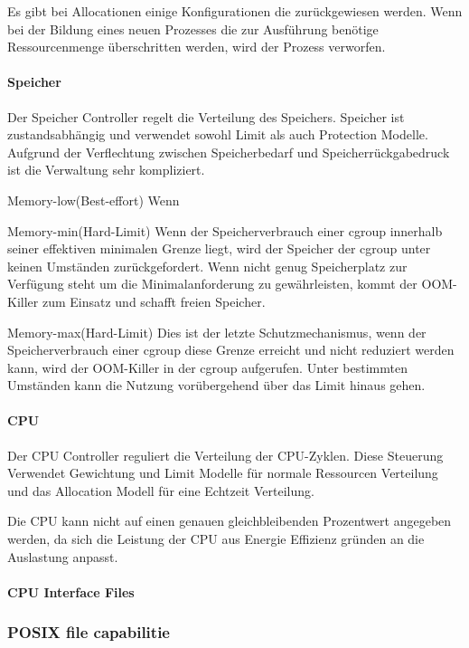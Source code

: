 \documentclass[12pt,a4paper,bibliography=totocnumbered,listof=totocnumbered]{scrartcl}
\begin{document}
Es gibt bei Allocationen einige Konfigurationen die zurückgewiesen werden. Wenn bei der Bildung eines neuen Prozesses die zur Ausführung benötige Ressourcenmenge überschritten werden, wird der Prozess verworfen.

\paragraph{Speicher}
Der Speicher Controller regelt die Verteilung des Speichers. Speicher ist zustandsabhängig und verwendet sowohl Limit als auch Protection Modelle. Aufgrund der Verflechtung zwischen Speicherbedarf und Speicherrückgabedruck ist die Verwaltung sehr kompliziert.

Memory-low(Best-effort)
Wenn 

Memory-min(Hard-Limit)
Wenn der Speicherverbrauch einer cgroup innerhalb seiner effektiven minimalen Grenze liegt, wird der Speicher der cgroup unter keinen Umständen zurückgefordert. Wenn nicht genug Speicherplatz zur Verfügung steht um die Minimalanforderung zu gewährleisten, kommt der OOM-Killer zum Einsatz und schafft freien Speicher.

Memory-max(Hard-Limit)
Dies ist der letzte Schutzmechanismus, wenn der Speicherverbrauch einer cgroup diese Grenze erreicht und nicht reduziert werden kann, wird der OOM-Killer in der cgroup aufgerufen. Unter bestimmten Umständen kann die Nutzung vorübergehend über das Limit hinaus gehen.

\paragraph{CPU}
Der CPU Controller reguliert die Verteilung der CPU-Zyklen. Diese Steuerung Verwendet Gewichtung und Limit Modelle für normale Ressourcen Verteilung und das Allocation Modell für eine Echtzeit Verteilung.

Die CPU kann nicht auf einen genauen gleichbleibenden Prozentwert angegeben werden, da sich die Leistung der CPU aus Energie Effizienz gründen an die Auslastung anpasst.

\paragraph{CPU Interface Files}




\subsubsection{POSIX file capabilitie}
\end{document}
